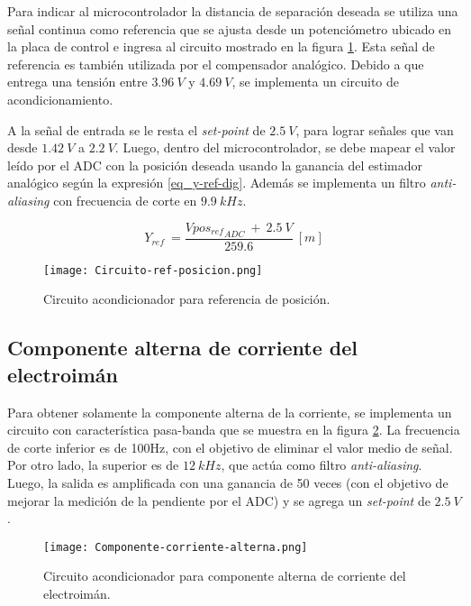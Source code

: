 \noindent Para indicar al microcontrolador la distancia de separación deseada se utiliza una señal continua como referencia que se ajusta desde un potenciómetro ubicado en la placa de control  e ingresa al circuito mostrado en la figura \ref{fig:circuito-ref-posicion}. Esta señal de referencia es también utilizada por el compensador analógico. Debido a que entrega una tensión entre $3.96\:V$ y $4.69\:V$, se implementa un circuito de acondicionamiento.

\noindent A la señal de entrada se le resta el \textsl{set-point} de $2.5\:V$, para lograr señales que van desde $1.42\:V$ a $2.2\:V$. Luego, dentro del microcontrolador, se debe mapear el valor leído por el ADC con la posición deseada usando la ganancia del estimador analógico según la expresión \ref{eq_y-ref-dig}. Además se implementa un filtro \textsl{anti-aliasing} con frecuencia de corte en $9.9\:kHz$.

\begin{equation} \label{eq_y-ref-dig}
	Y_{ref}\ =\frac{Vpo{s_{ref}}_{ADC}\ +\ 2.5\:V}{259.6}\:[m]
\end{equation}

\begin{figure}[H]
	\centering
	\texttt{[image: Circuito-ref-posicion.png]}
	\caption{Circuito acondicionador para referencia de posición.}
	\label{fig:circuito-ref-posicion}
\end{figure}

\subsection{Componente  alterna de corriente del electroimán}

\noindent Para obtener solamente la componente alterna de la corriente, se implementa un circuito con característica pasa-banda que se muestra en la figura \ref{fig:componente-corriente-alterna}. La frecuencia de corte inferior  es de 100Hz, con el objetivo de eliminar el valor medio de señal. Por otro lado, la superior es de $12 \:kHz$, que actúa como filtro \textsl{anti-aliasing}. Luego, la salida es amplificada con una ganancia de 50 veces (con el objetivo de mejorar la medición de la pendiente por el ADC) y se agrega un \textsl{set-point} de $2.5\:V$.

\begin{figure}[H]
	\centering
	\texttt{[image: Componente-corriente-alterna.png]}
	\caption{ Circuito acondicionador para componente alterna de corriente del electroimán.
	}
	\label{fig:componente-corriente-alterna}
\end{figure}

